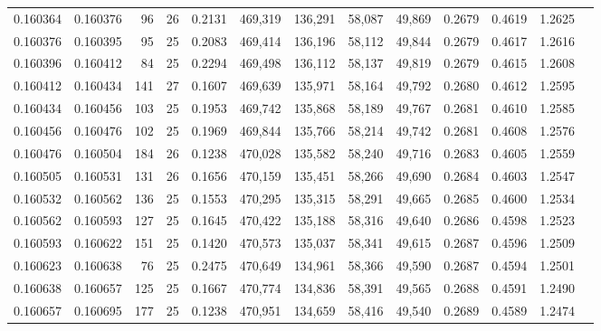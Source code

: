 \begin{tabular}{rrrrrrrrrrrrr}
0.160364 & 0.160376 &  96 &  26 &                                     0.2131 & 469,319 & 136,291 &  58,087 &  49,869 & 0.2679 & 0.4619 & 1.2625 \\
0.160376 & 0.160395 &  95 &  25 &                                     0.2083 & 469,414 & 136,196 &  58,112 &  49,844 & 0.2679 & 0.4617 & 1.2616 \\
0.160396 & 0.160412 &  84 &  25 &                                     0.2294 & 469,498 & 136,112 &  58,137 &  49,819 & 0.2679 & 0.4615 & 1.2608 \\
0.160412 & 0.160434 & 141 &  27 &                                     0.1607 & 469,639 & 135,971 &  58,164 &  49,792 & 0.2680 & 0.4612 & 1.2595 \\
0.160434 & 0.160456 & 103 &  25 &                                     0.1953 & 469,742 & 135,868 &  58,189 &  49,767 & 0.2681 & 0.4610 & 1.2585 \\
0.160456 & 0.160476 & 102 &  25 &                                     0.1969 & 469,844 & 135,766 &  58,214 &  49,742 & 0.2681 & 0.4608 & 1.2576 \\
0.160476 & 0.160504 & 184 &  26 &                                     0.1238 & 470,028 & 135,582 &  58,240 &  49,716 & 0.2683 & 0.4605 & 1.2559 \\
0.160505 & 0.160531 & 131 &  26 &                                     0.1656 & 470,159 & 135,451 &  58,266 &  49,690 & 0.2684 & 0.4603 & 1.2547 \\
0.160532 & 0.160562 & 136 &  25 &                                     0.1553 & 470,295 & 135,315 &  58,291 &  49,665 & 0.2685 & 0.4600 & 1.2534 \\
0.160562 & 0.160593 & 127 &  25 &                                     0.1645 & 470,422 & 135,188 &  58,316 &  49,640 & 0.2686 & 0.4598 & 1.2523 \\
0.160593 & 0.160622 & 151 &  25 &                                     0.1420 & 470,573 & 135,037 &  58,341 &  49,615 & 0.2687 & 0.4596 & 1.2509 \\
0.160623 & 0.160638 &  76 &  25 &                                     0.2475 & 470,649 & 134,961 &  58,366 &  49,590 & 0.2687 & 0.4594 & 1.2501 \\
0.160638 & 0.160657 & 125 &  25 &                                     0.1667 & 470,774 & 134,836 &  58,391 &  49,565 & 0.2688 & 0.4591 & 1.2490 \\
0.160657 & 0.160695 & 177 &  25 &                                     0.1238 & 470,951 & 134,659 &  58,416 &  49,540 & 0.2689 & 0.4589 & 1.2474 \\

\end{tabular}
